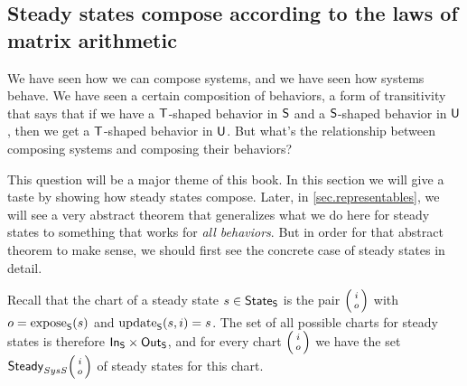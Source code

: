 \documentclass[DynamicalBook]{subfiles}
\begin{document}
\subsection{Steady states compose according to the laws of matrix arithmetic}\label{sec.steady_states_matrix_arithmetic}


We have seen how we can compose systems, and we have seen how systems behave. We
have seen a certain composition of behaviors, a form of transitivity that says
that if we have a $\mathsf{T}$-shaped behavior in $\mathsf{S}$ and a $\mathsf{S}$-shaped
behavior in $\mathsf{U}$, then we get a $\mathsf{T}$-shaped behavior in $\mathsf{U}$. But what's the relationship between composing systems and composing their behaviors?

This question will be a major theme of this book. In this section we will give a
taste by showing how steady states compose. Later, in \cref{sec.representables}, we will see a very abstract
theorem that generalizes what we do here for steady states to something that works for \emph{all behaviors}.
But in order for that abstract theorem to make sense, we should first see the concrete
case of steady states in detail.  

Recall that the chart of a steady state $s \in \mathsf{State}_{\mathsf{S}}$ is the pair
$\lens{i}{o}$ with $o = \mathrm{expose}_{\mathsf{S}}(s)$ and $\mathrm{update}_{\mathsf{S}}(s, i) = s$. The set of all
possible charts for steady states is therefore $\mathsf{In}_{\mathsf{S}} \times \mathsf{Out}_{\mathsf{S}}$, and for
every chart $\lens{i}{o}$ we have the set $\Set{Steady}_{Sys{S}}\lens{i}{o}$ of
steady states for this chart. 
\end{document}

